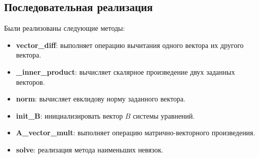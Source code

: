 \documentclass{article}
\begin{document}
\subsection{Последовательная реализация}
Были реализованы следующие методы:
\begin{itemize}
    \item \textbf{vector\_diff}: выполняет операцию вычитания одного вектора их другого вектора.
    \item \textbf{\_inner\_product}: вычисляет скалярное произведение двух заданных векторов.
    \item \textbf{norm}: вычисляет евклидову норму заданного вектора.
    \item \textbf{init\_B}: инициализировать вектор $B$ системы уравнений.
    \item \textbf{A\_vector\_mult}: выполняет операцию матрично-векторного произведения. 
    \item \textbf{solve}: реализация метода наименьших невязок.
\end{itemize}
\end{document}
